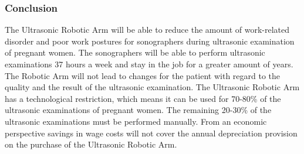 \subsubsection{Conclusion} 
The Ultrasonic Robotic Arm will be able to reduce the amount of work-related disorder and poor work postures for sonographers during ultrasonic examination of pregnant women. The sonographers will be able to perform ultrasonic examinations 37 hours a week and stay in the job for a greater amount of years. The Robotic Arm will not lead to changes for the patient with regard to the quality and the result of the ultrasonic examination. 
The Ultrasonic Robotic Arm has a technological restriction, which means it can be used for 70-80\% of the ultrasonic examinations of pregnant women. The remaining 20-30\% of the ultrasonic examinations must be performed manually. From an economic perspective savings in wage costs will not cover the annual depreciation provision on the purchase of the Ultrasonic Robotic Arm.


